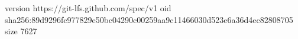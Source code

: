 version https://git-lfs.github.com/spec/v1
oid sha256:89d9296fc977829e50bc04290c00259aa9c11466030d523e6a36d4ec82808705
size 7627
